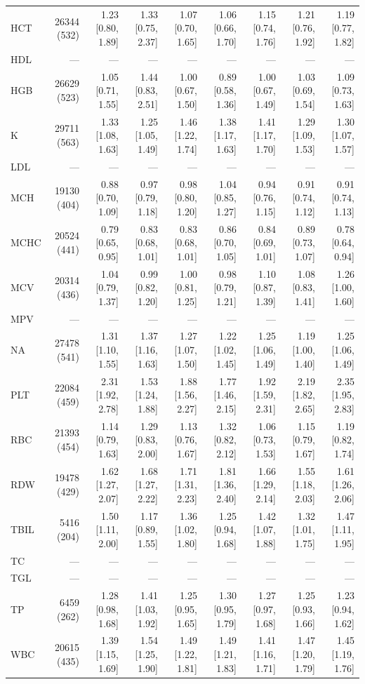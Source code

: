 \begin{table}[ht]
\begin{tabular}{lrrrrrrrr}
HCT & 26344 (532) & 1.23 [0.80, 1.89] & 1.33 [0.75, 2.37] & 1.07 [0.70, 1.65] & 1.06 [0.66, 1.70] & 1.15 [0.74, 1.76] & 1.21 [0.76, 1.92] & 1.19 [0.77, 1.82] \\
HDL & --- & --- & --- & --- & --- & --- & --- & --- \\
HGB & 26629 (523) & 1.05 [0.71, 1.55] & 1.44 [0.83, 2.51] & 1.00 [0.67, 1.50] & 0.89 [0.58, 1.36] & 1.00 [0.67, 1.49] & 1.03 [0.69, 1.54] & 1.09 [0.73, 1.63] \\
K & 29711 (563) & 1.33 [1.08, 1.63] & 1.25 [1.05, 1.49] & 1.46 [1.22, 1.74] & 1.38 [1.17, 1.63] & 1.41 [1.17, 1.70] & 1.29 [1.09, 1.53] & 1.30 [1.07, 1.57] \\
LDL & --- & --- & --- & --- & --- & --- & --- & --- \\
MCH & 19130 (404) & 0.88 [0.70, 1.09] & 0.97 [0.79, 1.18] & 0.98 [0.80, 1.20] & 1.04 [0.85, 1.27] & 0.94 [0.76, 1.15] & 0.91 [0.74, 1.12] & 0.91 [0.74, 1.13] \\
MCHC & 20524 (441) & 0.79 [0.65, 0.95] & 0.83 [0.68, 1.01] & 0.83 [0.68, 1.01] & 0.86 [0.70, 1.05] & 0.84 [0.69, 1.01] & 0.89 [0.73, 1.07] & 0.78 [0.64, 0.94] \\
MCV & 20314 (436) & 1.04 [0.79, 1.37] & 0.99 [0.82, 1.20] & 1.00 [0.81, 1.25] & 0.98 [0.79, 1.21] & 1.10 [0.87, 1.39] & 1.08 [0.83, 1.41] & 1.26 [1.00, 1.60] \\
MPV & --- & --- & --- & --- & --- & --- & --- & --- \\
NA & 27478 (541) & 1.31 [1.10, 1.55] & 1.37 [1.16, 1.63] & 1.27 [1.07, 1.50] & 1.22 [1.02, 1.45] & 1.25 [1.06, 1.49] & 1.19 [1.00, 1.40] & 1.25 [1.06, 1.49] \\
PLT & 22084 (459) & 2.31 [1.92, 2.78] & 1.53 [1.24, 1.88] & 1.88 [1.56, 2.27] & 1.77 [1.46, 2.15] & 1.92 [1.59, 2.31] & 2.19 [1.82, 2.65] & 2.35 [1.95, 2.83] \\
RBC & 21393 (454) & 1.14 [0.79, 1.63] & 1.29 [0.83, 2.00] & 1.13 [0.76, 1.67] & 1.32 [0.82, 2.12] & 1.06 [0.73, 1.53] & 1.15 [0.79, 1.67] & 1.19 [0.82, 1.74] \\
RDW & 19478 (429) & 1.62 [1.27, 2.07] & 1.68 [1.27, 2.22] & 1.71 [1.31, 2.23] & 1.81 [1.36, 2.40] & 1.66 [1.29, 2.14] & 1.55 [1.18, 2.03] & 1.61 [1.26, 2.06] \\
TBIL & 5416 (204) & 1.50 [1.11, 2.00] & 1.17 [0.89, 1.55] & 1.36 [1.02, 1.80] & 1.25 [0.94, 1.68] & 1.42 [1.07, 1.88] & 1.32 [1.01, 1.75] & 1.47 [1.11, 1.95] \\
TC & --- & --- & --- & --- & --- & --- & --- & --- \\
TGL & --- & --- & --- & --- & --- & --- & --- & --- \\
TP & 6459 (262) & 1.28 [0.98, 1.68] & 1.41 [1.03, 1.92] & 1.25 [0.95, 1.65] & 1.30 [0.95, 1.79] & 1.27 [0.97, 1.68] & 1.25 [0.93, 1.66] & 1.23 [0.94, 1.62] \\
WBC & 20615 (435) & 1.39 [1.15, 1.69] & 1.54 [1.25, 1.90] & 1.49 [1.22, 1.81] & 1.49 [1.21, 1.83] & 1.41 [1.16, 1.71] & 1.47 [1.20, 1.79] & 1.45 [1.19, 1.76] \\
\bottomrule
\end{tabular}
\label{tab:13_cox_eicu_aki}
\end{table}